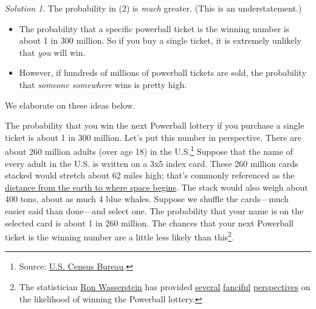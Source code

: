 \documentclass[
  letterpaper,
  DIV=11,
  numbers=noendperiod]{scrreprt}
\providecommand{\tightlist}{%
  \setlength{\itemsep}{0pt}\setlength{\parskip}{0pt}}
\theoremstyle{plain}
\theoremstyle{definition}
\theoremstyle{definition}
\theoremstyle{definition}
\theoremstyle{remark}
\newtheorem{refsolution}{Solution}[chapter]
\begin{document}
\begin{tcolorbox}[enhanced jigsaw, opacityback=0, rightrule=.15mm, coltitle=black, colframe=quarto-callout-tip-color-frame, toprule=.15mm, colbacktitle=quarto-callout-tip-color!10!white, opacitybacktitle=0.6, left=2mm, toptitle=1mm, breakable, title={Solution (click to expand)}, bottomtitle=1mm, colback=white, leftrule=.75mm, titlerule=0mm, arc=.35mm, bottomrule=.15mm]

\begin{refsolution}
The probability in (2) is \emph{much} greater. (This is an
understatement.)

\begin{itemize}
\tightlist
\item
  The probability that a specific powerball ticket is the winning number
  is about 1 in 300 million. So if you buy a single ticket, it is
  extremely unlikely that \emph{you} will win.
\item
  However, if hundreds of millions of powerball tickets are sold, the
  probability that \emph{someone somewhere} wins is pretty high.
\end{itemize}

We elaborate on these ideas below.

\label{sol-probability-interpret3}

\end{refsolution}

\end{tcolorbox}

The probability that you win the next Powerball lottery if you purchase
a single ticket is about 1 in 300 million. Let's put this number in
perspective. There are about 260 million adults (over age 18) in the
U.S.\footnote{Source:
  \href{https://www.census.gov/data/tables/2020/demo/popest/2020-demographic-analysis-tables.html}{U.S.
  Census Bureau}.} Suppose that the name of every adult in the U.S. is
written on a 3x5 index card. These 260 million cards stacked would
stretch about 62 miles high; that's commonly referenced as the
\href{https://astronomy.com/news/2021/03/the-krmn-line-where-does-space-begin}{distance
from the earth to where space begins}. The stack would also weigh about
400 tons, about as much 4 blue whales. Suppose we shuffle the
cards---much easier said than done---and select one. The probability
that your name is on the selected card is about 1 in 260 million. The
chances that your next Powerball ticket is the winning number are a
little less likely than this\footnote{The statistician
  \href{https://twitter.com/ron_wasserstein?lang=en}{Ron Wasserstein}
  has provided
  \href{https://www.huffpost.com/entry/chances-of-winning-powerball-lottery_b_3288129}{several}
  \href{https://www.huffpost.com/entry/if-winning-the-powerball-_b_8961606}{fanciful}
  \href{https://www.npr.org/2016/01/12/462754290/powerball-you-cant-win-if-you-dont-play}{perspectives}
  on the likelihood of winning the Powerball lottery.}.
\end{document}

